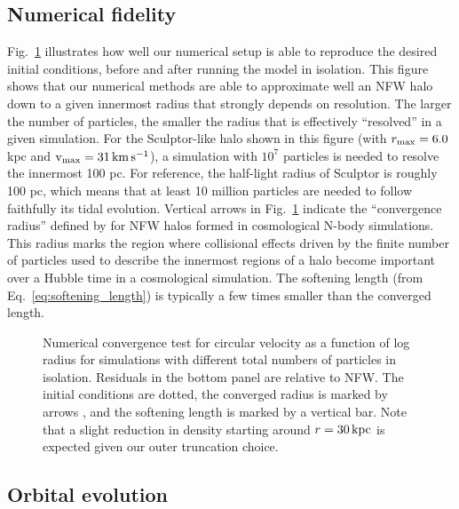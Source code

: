 \subsection{Numerical fidelity}\label{numerical-fidelity}

Fig.~\ref{fig:numerical_convergence} illustrates how well our numerical
setup is able to reproduce the desired initial conditions, before and
after running the model in isolation. This figure shows that our
numerical methods are able to approximate well an NFW halo down to a
given innermost radius that strongly depends on resolution. The larger
the number of particles, the smaller the radius that is effectively
``resolved'' in a given simulation. For the Sculptor-like halo shown in
this figure (with \(r_{\rm max} = 6.0\,\)kpc and \({\rm v}_{\rm max} = 31\,{\rm km\,s^{-1}}\)), a
simulation with \(10^7\) particles is needed to resolve the innermost
100 pc. For reference, the half-light radius of Sculptor is roughly 100
pc, which means that at least 10 million particles are needed to follow
faithfully its tidal evolution. Vertical arrows in
Fig.~\ref{fig:numerical_convergence} indicate the ``convergence radius''
defined by \citet[eq.\textasciitilde13]{power+2003} for NFW halos formed
in cosmological N-body simulations. This radius marks the region where
collisional effects driven by the finite number of particles used to
describe the innermost regions of a halo become important over a Hubble
time in a cosmological simulation. The softening length (from
Eq.~\ref{eq:softening_length}) is typically a few times smaller than the
converged length.

\begin{figure}
\centering
{}
\caption[Numerical convergence of the N-body simulation]{Numerical
convergence test for circular velocity as a function of log radius for
simulations with different total numbers of particles in isolation.
Residuals in the bottom panel are relative to NFW. The initial
conditions are dotted, the converged radius is marked by arrows
\citep[eq. 13,][]{power+2003}, and the softening length is marked by a
vertical bar. Note that a slight reduction in density starting around
\(r = 30\,{\rm kpc}\) is expected given our outer truncation
choice.}\label{fig:numerical_convergence}
\end{figure}

\subsection{Orbital evolution}\label{orbital-evolution}

